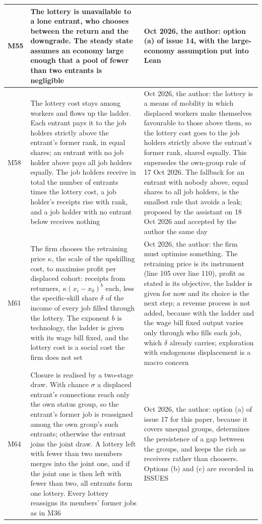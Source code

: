 \documentclass[10pt]{article}
\begin{document}
{\begin{longtable}{>{\raggedright\arraybackslash}p{0.9cm} >{\raggedright\arraybackslash}p{9.0cm} >{\raggedright\arraybackslash}p{13.0cm}}
M55 & The lottery is unavailable to a lone entrant, who chooses between the return and the downgrade. The steady state assumes an economy large enough that a pool of fewer than two entrants is negligible & 17 Oct 2026, the author: option (a) of issue 14, with the large-economy assumption put into Lean \\ \midrule
M58 & The lottery cost stays among workers and flows up the ladder. Each entrant pays it to the job holders strictly above the entrant's former rank, in equal shares; an entrant with no job holder above pays all job holders equally. The job holders receive in total the number of entrants times the lottery cost, a job holder's receipts rise with rank, and a job holder with no entrant below receives nothing & 18 Oct 2026, the author: the lottery is a means of mobility in which displaced workers make themselves favourable to those above them, so the lottery cost goes to the job holders strictly above the entrant's former rank, shared equally. This supersedes the own-group rule of 17 Oct 2026. The fallback for an entrant with nobody above, equal shares to all job holders, is the smallest rule that avoids a leak; proposed by the assistant on 18 Oct 2026 and accepted by the author the same day \\ \midrule
M61 & The firm chooses the retraining price $\kappa$, the scale of the upskilling cost, to maximise profit per displaced cohort: receipts from returners, $\kappa(x_i-x_0)^b$ each, less the specific-skill share $\delta$ of the income of every job filled through the lottery. The exponent $b$ is technology, the ladder is given with its wage bill fixed, and the lottery cost is a social cost the firm does not set & 19 Oct 2026, the author: the firm must optimise something. The retraining price is its instrument (line 105 over line 110), profit as stated is its objective, the ladder is given for now and its choice is the next step; a revenue process is not added, because with the ladder and the wage bill fixed output varies only through who fills each job, which $\delta$ already carries; exploration with endogenous displacement is a macro concern \\ \midrule
M64 & Closure is realised by a two-stage draw. With chance $\sigma$ a displaced entrant's connections reach only the own status group, so the entrant's former job is reassigned among the own group's such entrants; otherwise the entrant joins the joint draw. A lottery left with fewer than two members merges into the joint one, and if the joint one is then left with fewer than two, all entrants form one lottery. Every lottery reassigns its members' former jobs as in M36 & 19 Oct 2026, the author: option (a) of issue 17 for this paper, because it covers unequal groups, determines the persistence of a gap between the groups, and keeps the rich as receivers rather than choosers. Options (b) and (c) are recorded in ISSUES \\ \midrule
\end{longtable}}
\end{document}
